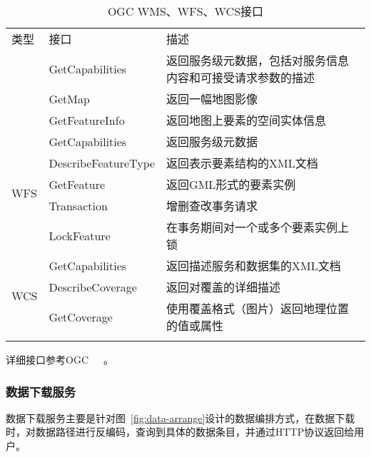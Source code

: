 \begin{table}
    \centering
    \caption{OGC WMS、WFS、WCS接口}
    \label{tab:OGC-WMS-WFS-WCS}
    \begin{threeparttable}
        \begin{tabular}{ l | l l}
            \Xhline{1.5pt}
            类型 & 接口 & 描述 \\
            \Xhline{1.5pt}
            \multirow{3}{*}{WMS} & GetCapabilities & \multicolumn{1}{m{0.6\columnwidth}}{返回服务级元数据，包括对服务信息内容和可接受请求参数的描述} \\
            \cline{2-3}
            & GetMap & 返回一幅地图影像 \\
            \cline{2-3}
            & GetFeatureInfo & 返回地图上要素的空间实体信息 \\
            \hline
            \multirow{5}{*}{WFS} & GetCapabilities & 返回服务级元数据 \\
            \cline{2-3}
            & DescribeFeatureType & 返回表示要素结构的XML文档 \\
            \cline{2-3}
            & GetFeature & 返回GML形式的要素实例 \\
            \cline{2-3}
            & Transaction & 增删查改事务请求 \\
            \cline{2-3}
            & LockFeature & 在事务期间对一个或多个要素实例上锁 \\
            \hline
            \multirow{3}{*}{WCS} & GetCapabilities & 返回描述服务和数据集的XML文档 \\
            \cline{2-3}
            & DescribeCoverage & 返回对覆盖的详细描述 \\
            \cline{2-3}
            & GetCoverage & 使用覆盖格式（图片）返回地理位置的值或属性 \\
            \Xhline{1.5pt}
        \end{tabular}
        \begin{tablenotes}
            \footnotesize
            \item 详细接口参考OGC~\cite{OGC-WMS}~\cite{OGC-WFS}~\cite{OGC-WCS}。
        \end{tablenotes}
    \end{threeparttable}
\end{table}

\subsubsection{数据下载服务}
数据下载服务主要是针对图~\ref{fig:data-arrange}设计的数据编排方式，在数据下载时，对数据路径进行反编码，查询到具体的数据条目，并通过HTTP协议返回给用户。

